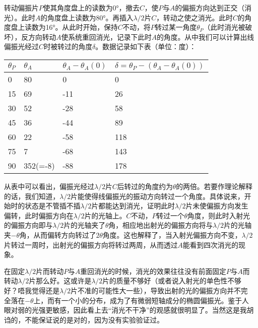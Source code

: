 \documentclass[UTF8]{ctexart}
\begin{document}
转动偏振片$P$使其角度盘上的读数为\ang{0}，撤去$C$，使$P$与$A$的偏振方向达到正交（消光）。此时$A$的角度盘上读数为\ang{80}。再插入$\lambda/2$片$C$，转动之使之消光。此时$C$的角度盘上读数为\ang{16}。从此时开始，保持$C$不动，将$P$转过某一角度$\theta_P$（此时消光被破坏），反方向转动$A$使系统重回消光，记录下此时$A$的角度。从中我们可以计算出线偏振光经过$C$时被转过的角度$\delta$。数据记录如下表（单位：度）：
\begin{center}
\begin{tabu} to \linewidth {X[c]|X[c]X[c]X[c]}
\hline
$\theta_P$	&$\theta_A$	&$\theta_A-\theta_A(0)$	&$\delta=\theta_P-(\theta_A-\theta_A(0))$\\
	&80	&0	&0\\
15	&69	&-11	&26\\
30	&52	&-28	&58\\
45	&36	&-44	&89\\
60	&22	&-58	&118\\
75	&7	&-68	&143\\
90	&352(=-8)	&-88	&178\\
\hline
\end{tabu}
\end{center}
从表中可以看出，偏振光经过$\lambda/2$片$C$后转过的角度约为$\theta$的两倍。若要作理论解释的话，我们知道，$\lambda/2$片能使得线偏振光的振动方向转过一个角度。具体说来，开始时的状态是不管插不插$\lambda/2$片都能达到消光，证明此时$\lambda/2$片未使偏振方向发生偏转，此时偏振方向在$\lambda/2$片的光轴上。$C$不动，$P$转过一个$\theta$角度，则此时入射光的偏振方向即与$\lambda/2$片的光轴夹了$\theta$角，相应地出射光的偏振方向将与$\lambda/2$片的光轴夹$-\theta$角，从而偏转方向转过了$2\theta$角度。这也解释了，当入射光偏振方向不变，$\lambda/2$片转过一周时，出射光的偏振方向将转过两周，从而透过$A$能看到四次消光的现象。

在固定$\lambda/2$片而转动$P$与$A$重回消光的时候，消光的效果往往没有前面固定$P$与$A$而转动$\lambda/2$片那么好。这或许是$\lambda/2$片的质量不够好（或者说入射光的单色性不够好？唔我觉得还是$\lambda/2$片不准的可能性大一些），导致出射的光的偏振方向并不完全落在$-\theta$上，而有一个小的分布，成为了有微弱短轴成分的椭圆偏振光。鉴于人眼对弱的光强更敏感，因此看上去“消光不干净”的观感就很明显了。当然这是我胡诌的，不能保证说的是对的，因为没有实验验证过。
\end{document}
